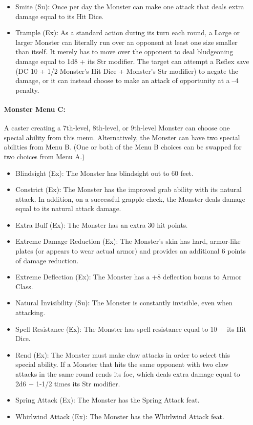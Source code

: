 \begin{itemize}
\item Smite (Su): Once per day the Monster can make one attack that deals extra damage equal to its Hit Dice.
\item Trample (Ex): As a standard action during its turn each round, 
a Large or larger Monster can literally run over an opponent at least one size smaller than itself. 
It merely has to move over the opponent to deal bludgeoning damage equal to 1d8 + its Str modifier. 
The target can attempt a Reflex save (DC 10 + 1/2 Monster's Hit Dice + Monster's Str modifier) 
to negate the damage, or it can instead choose to make an attack of opportunity at a –4 penalty.
\end{itemize}

\paragraph{Monster Menu C:}

A caster creating a 7th-level, 8th-level, or 9th-level Monster 
can choose one special ability from this menu. 
Alternatively, the Monster can have two special abilities from Menu B. 
(One or both of the Menu B choices can be swapped for two choices from Menu A.)
\begin{itemize}
\item Blindsight (Ex): The Monster has blindsight out to 60 feet.
\item Constrict (Ex): The Monster has the improved grab ability with its natural attack. 
In addition, on a successful grapple check, the Monster deals damage equal to its natural attack damage.
\item Extra Buff (Ex): The Monster has an extra 30 hit points.
\item Extreme Damage Reduction (Ex): The Monster's skin has hard, 
armor-like plates (or appears to wear actual armor) and provides an additional 6 points of damage reduction.
\item Extreme Deflection (Ex): The Monster has a +8 deflection bonus to Armor Class.
\item Natural Invisibility (Su): The Monster is constantly invisible, even when attacking. 
\item Spell Resistance (Ex): The Monster has spell resistance equal to 10 + its Hit Dice.
\item Rend (Ex): The Monster must make claw attacks in order to select this special ability. If a Monster that hits the same opponent with two claw attacks in the same round rends its foe, which deals extra damage equal to 2d6 + 1-1/2 times its Str modifier.
\item Spring Attack (Ex): The Monster has the Spring Attack feat.
\item Whirlwind Attack (Ex): The Monster has the Whirlwind Attack feat.
\end{itemize}
